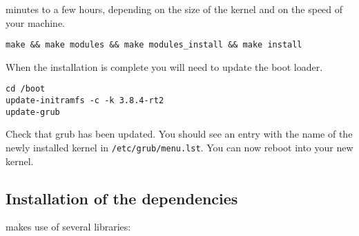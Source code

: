 \begin{enumerate}
  minutes to a few hours, depending on the size of the kernel and on the
  speed of your machine.
\begin{lstlisting}
make && make modules && make modules_install && make install
\end{lstlisting}
When the installation is complete you will need to update the boot loader.
\begin{lstlisting}
cd /boot
update-initramfs -c -k 3.8.4-rt2
update-grub
\end{lstlisting}
Check that grub has been updated. You should see an entry with the
name of the newly installed kernel in
\texttt{/etc/grub/menu.lst}. You can now reboot into your new kernel.
\end{enumerate}

\subsection{Installation of the dependencies}
\label{install:required}
\progname makes use of several libraries:
